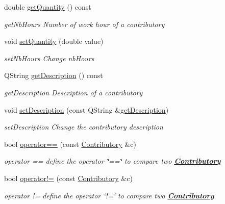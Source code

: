 \begin{DoxyCompactItemize}
double \hyperlink{classModels_1_1Contributory_a7c5fdd6e53641ae441054ebe7393f59d}{get\-Quantity} () const 
\begin{DoxyCompactList}\small\item\em get\-Nb\-Hours Number of work hour of a contributory \end{DoxyCompactList}\item 
void \hyperlink{classModels_1_1Contributory_afe02bdd167c6aed02c81a6e684293e99}{set\-Quantity} (double value)
\begin{DoxyCompactList}\small\item\em set\-Nb\-Hours Change nb\-Hours \end{DoxyCompactList}\item 
Q\-String \hyperlink{classModels_1_1Contributory_ae2b936f2fb1ccad2009eae9b5d12fc02}{get\-Description} () const 
\begin{DoxyCompactList}\small\item\em get\-Description Description of a contributory \end{DoxyCompactList}\item 
void \hyperlink{classModels_1_1Contributory_a12d4199fa7175c0b43f62eddf7c3d69e}{set\-Description} (const Q\-String \&\hyperlink{classModels_1_1Contributory_ae2b936f2fb1ccad2009eae9b5d12fc02}{get\-Description})
\begin{DoxyCompactList}\small\item\em set\-Description Change the contributory description \end{DoxyCompactList}\item 
bool \hyperlink{classModels_1_1Contributory_ad49c8b9cdf7254069e07f2238b42c8f3}{operator==} (const \hyperlink{classModels_1_1Contributory}{Contributory} \&c)
\begin{DoxyCompactList}\small\item\em operator == define the operator \char`\"{}==\char`\"{} to compare two {\bfseries \hyperlink{classModels_1_1Contributory}{Contributory}} \end{DoxyCompactList}\item 
bool \hyperlink{classModels_1_1Contributory_a0808e6453b222f62d3288361dcb56d16}{operator!=} (const \hyperlink{classModels_1_1Contributory}{Contributory} \&c)
\begin{DoxyCompactList}\small\item\em operator != define the operator \char`\"{}!=\char`\"{} to compare two {\bfseries \hyperlink{classModels_1_1Contributory}{Contributory}} \end{DoxyCompactList}\item 

\end{DoxyCompactItemize}
